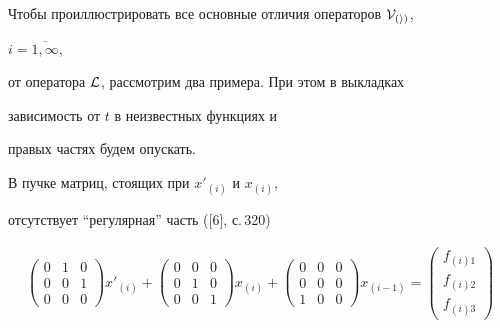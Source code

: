  


Чтобы проиллюстрировать все основные отличия операторов $\cal V_{(i)}$, 


$i=\overline{1,\infty}$,


от оператора $\cal L$, рассмотрим два примера. При этом в выкладках 


зависимость от $t$ в неизвестных функциях и 


правых частях будем опускать.





\begin{exam}


В пучке матриц, стоящих при $x'_{(i)}$ и $x_{(i)}$, 


отсутствует ``регулярная'' часть ([6], с.\,320)


\begin{gather}


\begin{pmatrix}


 0 & 1 & 0\\


 0 & 0 & 1\\


 0 & 0 & 0


\end{pmatrix} x'_{(i)}+


\begin{pmatrix}


 0 & 0 & 0\\


 0 & 1 & 0\\


 0 & 0 & 1


\end{pmatrix} x_{(i)}+


\begin{pmatrix}


 0 & 0 & 0\\


 0 & 0 & 0\\


 1 & 0 & 0


\end{pmatrix} x_{(i-1)}=


\begin{pmatrix}


 f_{(i)1}\\


 f_{(i)2}\\


 f_{(i)3}



\end{pmatrix}
\end{gather}
\end{exam}
